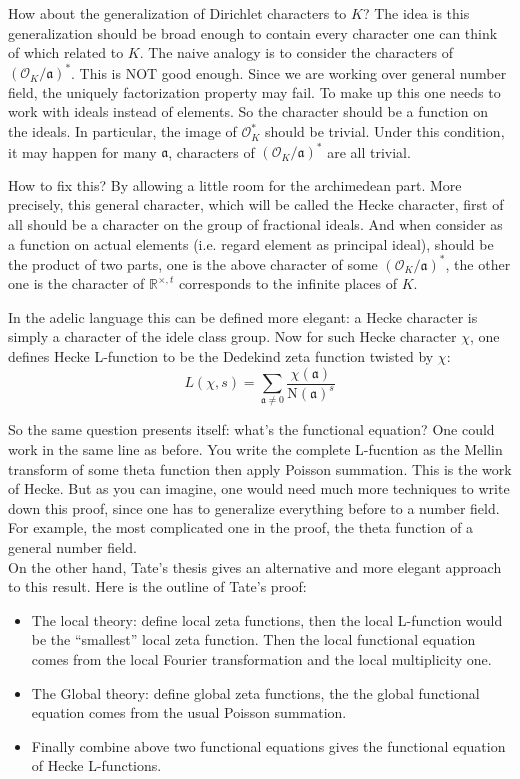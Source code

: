 \documentclass[10pt]{article}
\theoremstyle{plain}
\theoremstyle{remark}
\begin{document}
	How about the generalization of Dirichlet characters to $K$? The idea is this generalization should be broad enough to contain every character one can think of which related to $K$. The naive analogy is to consider the characters of $\left(\mathscr{O}_K/\mathfrak{a}\right)^*$. This is NOT good enough. Since we are working over general number field, the uniquely factorization property may fail. To make up this one needs to work with ideals instead of elements. So the character should be a function on the ideals. In particular, the image of $\mathscr{O}_K^*$ should be trivial. Under this condition, it may happen for many $\mathfrak{a}$, characters of $\left(\mathscr{O}_K/\mathfrak{a}\right)^*$ are all trivial. 
	
	How to fix this? By allowing a little room for the archimedean part. More precisely, this general character, which will be called the Hecke character, first of all should be a character on the group of fractional ideals. And when consider as a function on actual elements (i.e. regard element as principal ideal), should be the product of two parts, one is the above character of some $\left(\mathscr{O}_K/\mathfrak{a}\right)^*$, the other one is the character of $\mathbb{R}^{\times,t}$ corresponds to the infinite places of $K$.
	
	In the adelic language this can be defined more elegant: a Hecke character is simply a character of the idele class group. Now for such Hecke character $\chi$, one defines Hecke L-function to be the Dedekind zeta function twisted by $\chi$:
	$$L(\chi,s)=\sum_{\mathfrak{a}\not=0}\frac{\chi(\mathfrak{a})}{\mathrm{N}(\mathfrak{a})^s}$$
	
	So the same question presents itself: what's the functional equation? One could work in the same line as before. You write the complete L-fucntion as the Mellin transform of some theta function then apply Poisson summation. This is the work of Hecke. But as you can imagine, one would need much more techniques to write down this proof, since one has to generalize everything before to a number field. For example, the most complicated one in the proof, the theta function of a general number field.\\
	
	On the other hand, Tate's thesis gives an alternative and more elegant approach to this result. Here is the outline of Tate's proof:
	\begin{itemize}
		\item The local theory: define local zeta functions, then the local L-function would be the ``smallest'' local zeta function. Then the local functional equation comes from the local Fourier transformation and the local multiplicity one.
		\item The Global theory: define global zeta functions, the the global functional equation comes from the usual Poisson summation.
		\item Finally combine above two functional equations gives the functional equation of Hecke L-functions.
	\end{itemize}
	
\end{document}
